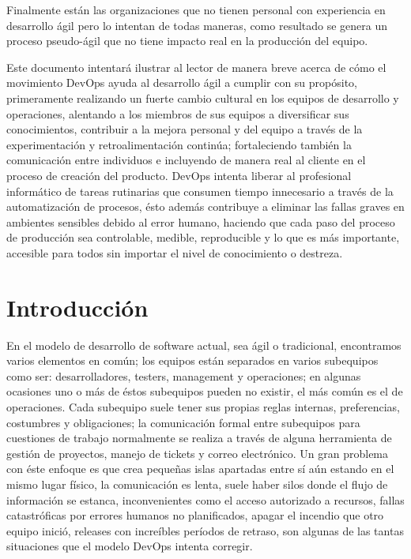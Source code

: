 \documentclass[conference]{IEEEtran}
\begin{document}
Finalmente están las organizaciones que no tienen personal con experiencia en desarrollo ágil pero lo intentan de todas maneras, como resultado se genera un proceso pseudo-ágil que no tiene impacto real en la producción del equipo.

Este documento intentará ilustrar al lector de manera breve acerca de cómo el movimiento DevOps ayuda al desarrollo ágil a cumplir con su propósito, primeramente realizando un fuerte cambio cultural en los equipos de desarrollo y operaciones, alentando a los miembros de sus equipos a diversificar sus conocimientos, contribuir a la mejora personal y del equipo a través de la experimentación y retroalimentación continúa; fortaleciendo también la comunicación entre individuos e incluyendo de manera real al cliente en el proceso de creación del producto. DevOps intenta liberar al profesional informático de tareas rutinarias que consumen tiempo innecesario a través de la automatización de procesos, ésto además contribuye a eliminar las fallas graves en ambientes sensibles debido al error humano, haciendo que cada paso del proceso de producción sea controlable, medible, reproducible y lo que es más importante, accesible para todos sin importar el nivel de conocimiento o destreza.



%
\IEEEpeerreviewmaketitle



\section{Introducción}
En el modelo de desarrollo de software actual, sea ágil o tradicional, encontramos varios elementos en común; los equipos están separados en varios subequipos como ser: desarrolladores, testers, management y operaciones; en algunas ocasiones uno o más de éstos subequipos pueden no existir, el más común es el de operaciones. Cada subequipo suele tener sus propias reglas internas, preferencias, costumbres y obligaciones; la comunicación formal entre subequipos para cuestiones de trabajo normalmente se realiza a través de alguna herramienta de gestión de proyectos, manejo de tickets y correo electrónico. Un gran problema con éste enfoque es que crea pequeñas islas apartadas entre sí aún estando en el mismo lugar físico, la comunicación es lenta, suele haber silos donde el flujo de información se estanca, inconvenientes como el acceso autorizado a recursos, fallas catastróficas por errores humanos no planificados, apagar el incendio que otro equipo inició, releases con increíbles períodos de retraso, son algunas de las tantas situaciones que el modelo DevOps intenta corregir. 
\end{document}
